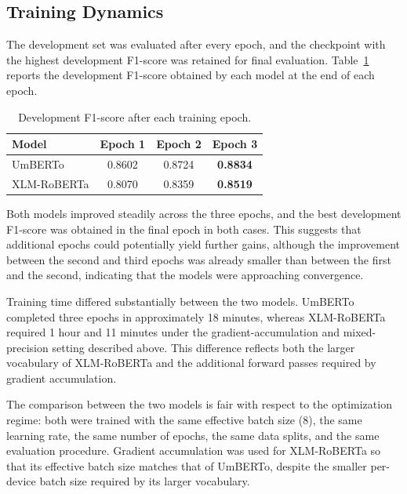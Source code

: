 \subsection{Training Dynamics}
\label{subsec:train-dynamics}

The development set was evaluated after every epoch, and the checkpoint with the highest development F1-score was retained for final evaluation. Table~\ref{tab:dev-f1} reports the development F1-score obtained by each model at the end of each epoch.

\begin{table}[H]
    \centering
    \caption{Development F1-score after each training epoch.}
    \label{tab:dev-f1}
    \begin{tabular}{lccc}
        \hline
        \textbf{Model} & \textbf{Epoch 1} & \textbf{Epoch 2} & \textbf{Epoch 3} \\
        \hline
        UmBERTo & 0.8602 & 0.8724 & \textbf{0.8834} \\
        XLM-RoBERTa & 0.8070 & 0.8359 & \textbf{0.8519} \\
        \hline
    \end{tabular}
\end{table}

Both models improved steadily across the three epochs, and the best development F1-score was obtained in the final epoch in both cases. This suggests that additional epochs could potentially yield further gains, although the improvement between the second and third epochs was already smaller than between the first and the second, indicating that the models were approaching convergence.

Training time differed substantially between the two models. UmBERTo completed three epochs in approximately 18 minutes, whereas XLM-RoBERTa required 1 hour and 11 minutes under the gradient-accumulation and mixed-precision setting described above. This difference reflects both the larger vocabulary of XLM-RoBERTa and the additional forward passes required by gradient accumulation.

The comparison between the two models is fair with respect to the optimization regime: both were trained with the same effective batch size (8), the same learning rate, the same number of epochs, the same data splits, and the same evaluation procedure. Gradient accumulation was used for XLM-RoBERTa so that its effective batch size matches that of UmBERTo, despite the smaller per-device batch size required by its larger vocabulary.

